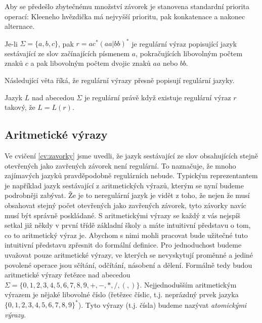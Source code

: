 Aby se předešlo zbytečnému množství závorek je stanovena standardní priorita operací: Kleeneho  hvězdička má nejvyšší prioritu, pak konkatenace a
nakonec alternace. 

\begin{example} Je-li \(\Sigma=\{a,b,c\}\), pak \(r=ac^*(aa|bb)^*\) je regulární výraz popisující jazyk sestávající ze slov začínajících písmenem \(a\), pokračujících libovolným počtem znaků \(c\)
a pak libovolným počtem dvojic znaků \(aa\) nebo \(bb\).
\end{example}

Následující věta říká, že regulární výrazy přesně popisují regulární jazyky.

\begin{theorem} Jazyk \(L\) nad abecedou \(\Sigma\) je regulární právě když existuje regulární výraz \(r\) takový, že \(L=L(r)\).
\end{theorem}


\subsection*{Aritmetické výrazy}
Ve cvičení \ref{cv:zavorky} jsme uvedli, že jazyk sestávající ze slov obsahujících
stejně otevřených jako zavřených závorek není regulární. To naznačuje, že 
mnoho zajímavých jazyků pravděpodobně regulárních nebude. Typickým reprezentantem
je například jazyk sestávající z aritmetických výrazů, kterým se nyní budeme
podrobněji zabývat. Že je to neregulární jazyk je vidět z toho, že nejen že
musí obsahovat stejný počet otevřených jako zavřených závorek, tyto závorky
navíc musí být správně poskládané. S aritmetickými výrazy se každý z vás nejspíš
setkal již někdy v první třídě základní školy a máte intuitivní představu o tom, 
co to aritmetický výraz je. Abychom s nimi mohli pracovat bude užitečné tuto
intuitivní představu zpřesnit do formální definice. Pro jednoduchost budeme
uvažovat pouze aritmetické výrazy, ve kterých se nevyskytují proměnné a jediné
povolené operace jsou sčítání, odčítání, násobení a dělení. Formálně tedy budou 
aritmetické výrazy řetězce nad abecedou 
\(\Sigma = \{0,1,2,3,4,5,6,7,8,9,+,-,*,/,(,)\}\). Nejjednodušším
aritmetickým výrazem je nějaké libovolné číslo (řetězec číslic, t.j. 
neprázdný prvek jazyka \(\{0,1,2,3,4,5,6,7,8,9\}^*\)).
Tyto výrazy (t.j. čísla) budeme nazývat \emph{atomickými výrazy}. 

